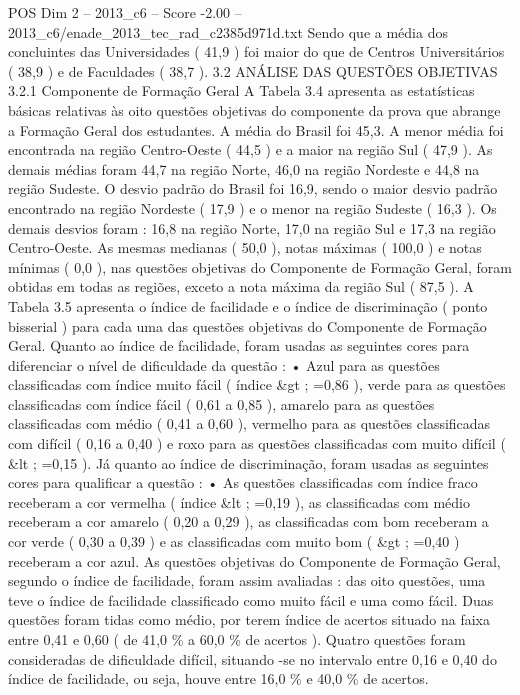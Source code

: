 \begin{textsample}{POS Dim 2 – 2013\_c6 – Score -2.00 – 2013\_c6/enade\_2013\_tec\_rad\_c2385d971d.txt}
Sendo que a média dos concluintes das Universidades ( 41,9 ) foi maior do que de Centros Universitários ( 38,9 ) e de Faculdades ( 38,7 ). 3.2 ANÁLISE DAS QUESTÕES OBJETIVAS 3.2.1 Componente de Formação Geral A Tabela 3.4 apresenta as estatísticas básicas relativas às oito questões objetivas do componente da prova que abrange a Formação Geral dos estudantes.
A média do Brasil foi 45,3.
A menor média foi encontrada na região Centro-Oeste ( 44,5 ) e a maior na região Sul ( 47,9 ).
As demais médias foram 44,7 na região Norte, 46,0 na região Nordeste e 44,8 na região Sudeste.
O desvio padrão do Brasil foi 16,9, sendo o maior desvio padrão encontrado na região Nordeste ( 17,9 ) e o menor na região Sudeste ( 16,3 ).
Os demais desvios foram : 16,8 na região Norte, 17,0 na região Sul e 17,3 na região Centro-Oeste.
As mesmas medianas ( 50,0 ), notas máximas ( 100,0 ) e notas mínimas ( 0,0 ), nas questões objetivas do Componente de Formação Geral, foram obtidas em todas as regiões, exceto a nota máxima da região Sul ( 87,5 ).
A Tabela 3.5 apresenta o índice de facilidade e o índice de discriminação ( ponto bisserial ) para cada uma das questões objetivas do Componente de Formação Geral.
Quanto ao índice de facilidade, foram usadas as seguintes cores para diferenciar o nível de dificuldade da questão : • Azul para as questões classificadas com índice muito fácil ( índice \&gt ; =0,86 ), verde para as questões classificadas com índice fácil ( 0,61 a 0,85 ), amarelo para as questões classificadas com médio ( 0,41 a 0,60 ), vermelho para as questões classificadas com difícil ( 0,16 a 0,40 ) e roxo para as questões classificadas com muito difícil ( \&lt ; =0,15 ).
Já quanto ao índice de discriminação, foram usadas as seguintes cores para qualificar a questão : • As questões classificadas com índice fraco receberam a cor vermelha ( índice \&lt ; =0,19 ), as classificadas com médio receberam a cor amarelo ( 0,20 a 0,29 ), as classificadas com bom receberam a cor verde ( 0,30 a 0,39 ) e as classificadas com muito bom ( \&gt ; =0,40 ) receberam a cor azul.
As questões objetivas do Componente de Formação Geral, segundo o índice de facilidade, foram assim avaliadas : das oito questões, uma teve o índice de facilidade classificado como muito fácil e uma como fácil.
Duas questões foram tidas como médio, por terem índice de acertos situado na faixa entre 0,41 e 0,60 ( de 41,0 \% a 60,0 \% de acertos ).
Quatro questões foram consideradas de dificuldade difícil, situando -se no intervalo entre 0,16 e 0,40 do índice de facilidade, ou seja, houve entre 16,0 \% e 40,0 \% de acertos.

\end{textsample}
